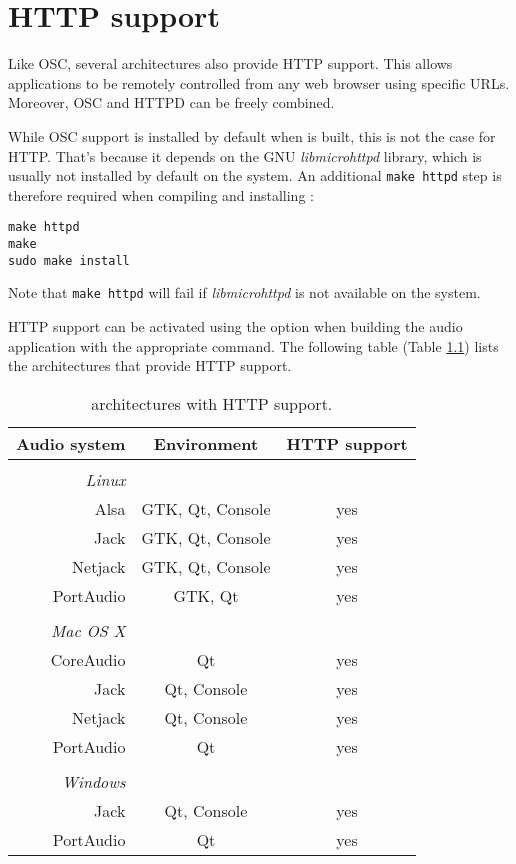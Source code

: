 \chapter{HTTP support} 
\label{http}

Like OSC, several \faust architectures also provide HTTP support. This allows \faust applications to be remotely controlled from any web browser using specific URLs. Moreover, OSC and HTTPD can be freely combined.

While OSC support is installed by default when \faust is built, this is not the case for HTTP. That's because it depends on the GNU \emph{libmicrohttpd} library, which is usually not installed by default on the system. An additional \lstinline'make httpd' step is therefore required when compiling and installing \faust:
\begin{lstlisting}
make httpd
make
sudo make install
\end{lstlisting}
Note that \lstinline'make httpd' will fail if \emph{libmicrohttpd} is not available on the system.

HTTP support can be activated using the  option when building the audio application with the appropriate  command. The following table (Table \ref{tab:httparch}) lists the \faust architectures that provide HTTP support. 

\begin{table}[htp]
\begin{center}
\begin{tabular}{rcc}
\hline
\bf{Audio system} 	& \bf{Environment} & \bf{HTTP support}	\\
\hline
\\
\emph{Linux}\\
Alsa  			& GTK, Qt, Console		& yes\\
Jack 			& GTK, Qt, Console		& yes\\
Netjack 			& GTK, Qt, Console & yes\\
PortAudio 		& GTK, Qt				& yes\\
\\
\emph{Mac OS X} \\
CoreAudio 		& Qt 			& yes\\
Jack 			& Qt, Console & yes\\
Netjack 			& Qt, Console & yes\\
PortAudio 		& Qt 			& yes\\
\\
\emph{Windows} \\
Jack 			& Qt, Console & yes\\
PortAudio 		& Qt 			& yes\\
\hline
\end{tabular}
\end{center}
\caption{\faust architectures with HTTP support.}
\label{tab:httparch}
\end{table}


